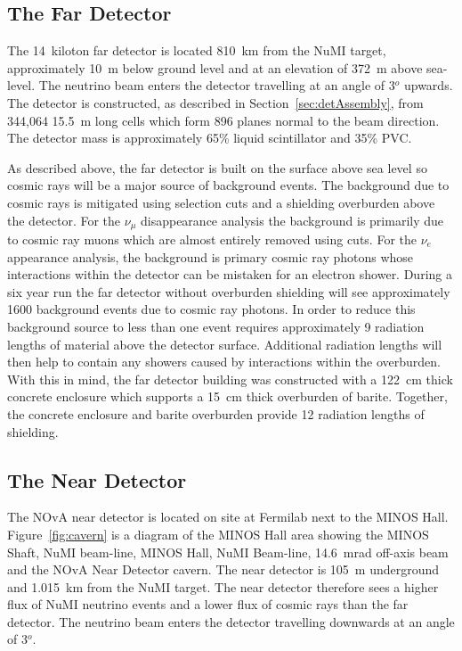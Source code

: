 \subsection{The Far Detector}\label{sec:fardet}

The 14~kiloton far detector is located 810~km from the NuMI target,
approximately 10~m below ground level and at an elevation of 372~m
above sea-level. The neutrino beam enters the
detector travelling at an angle of 3$^o$ upwards. The detector is
constructed, as described in Section~\ref{sec:detAssembly}, from
344,064 15.5~m long cells which form 896 planes normal to the beam
direction. The detector mass is approximately 65\% liquid scintillator
and 35\% PVC.

As described above, the far detector is built on the surface above sea
level so cosmic rays will be a major source of
background events. The background due to cosmic rays is mitigated
using selection cuts and a shielding overburden above the detector.
For the $\nu_{\mu}$ disappearance analysis the background is primarily
due to cosmic ray muons which are almost entirely removed using cuts. For
the $\nu_e$
appearance analysis, the background is primary cosmic ray photons
whose interactions within the detector can be mistaken for an electron
shower. 
During a six year run the far detector without overburden shielding will see
approximately 1600 background events due to cosmic ray photons. In
order to reduce this background source to less than one event requires
approximately 9 radiation lengths of material above the detector
surface. Additional radiation lengths will then help to contain any
showers caused by interactions within the overburden. With this in
mind, the far detector building was constructed with a 122~cm thick
concrete enclosure which supports a 15~cm thick overburden of
barite. Together, the concrete enclosure and barite overburden provide
12 radiation lengths of shielding.


\subsection{The Near Detector}\label{sec:neardet}

The NOvA near detector is located on site at Fermilab next to the
MINOS Hall. Figure~\ref{fig:cavern} is a diagram of the MINOS Hall
area showing the MINOS Shaft, NuMI beam-line, MINOS Hall, NuMI
Beam-line, 14.6~mrad off-axis beam and the NOvA Near Detector cavern. 
The near detector is 105~m
underground and 1.015~km from the NuMI target. The near detector
therefore sees a higher flux of NuMI neutrino events and a lower flux
of cosmic rays than the far detector.
The neutrino beam enters the detector travelling downwards at an angle
of 3$^o$. 

